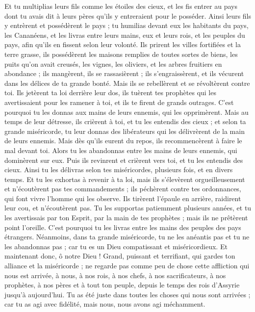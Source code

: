 \begin{multicols}{2}
Et tu multiplias leurs fils comme les étoiles des cieux, et les fis entrer au pays dont tu avais dit à leurs pères qu'ils y entreraient pour le posséder.
Ainsi leurs fils y entrèrent et possédèrent le pays ; tu humilias devant eux les habitants du pays, les Cananéens, et les livras entre leurs mains, eux et leurs rois, et les peuples du pays, afin qu'ils en fissent selon leur volonté.
Ils prirent les villes fortifiées et la terre grasse, ils possédèrent les maisons remplies de toutes sortes de biens, les puits qu'on avait creusés, les vignes, les oliviers, et les arbres fruitiers en abondance ; ils mangèrent, ils se rassasièrent ; ils s'engraissèrent, et ils vécurent dans les délices de ta grande bonté.
Mais ils se rebellèrent et se révoltèrent contre toi. Ils jetèrent ta loi derrière leur dos, ils tuèrent tes prophètes qui les avertissaient pour les ramener à toi, et ils te firent de grands outrages.
C'est pourquoi tu les donnas aux mains de leurs ennemis, qui les opprimèrent. Mais au temps de leur détresse, ils crièrent à toi, et tu les entendis des cieux ; et selon ta grande miséricorde, tu leur donnas des libérateurs qui les délivrèrent de la main de leurs ennemis.
Mais dès qu'ils eurent du repos, ils recommencèrent à faire le mal devant toi. Alors tu les abandonnas entre les mains de leurs ennemis, qui dominèrent sur eux. Puis ils revinrent et crièrent vers toi, et tu les entendis des cieux. Ainsi tu les délivras selon tes miséricordes, plusieurs fois, et en divers temps.
Et tu les exhortas à revenir à ta loi, mais ils s’élevèrent  orgueilleusement et n'écoutèrent pas tes commandements ;  ils péchèrent contre tes ordonnances, qui font vivre l’homme qui les observe. Ils tirèrent l'épaule en arrière, raidirent leur cou, et n'écoutèrent pas.
Tu les supportas patiemment plusieurs années, et tu les avertissais par ton Esprit, par la main de tes prophètes ; mais ils ne prêtèrent point l'oreille. C’est pourquoi tu les livras entre les mains des peuples des pays étrangers.
Néanmoins, dans ta grande miséricorde, tu ne les anéantis pas et tu ne les abandonnas pas ; car tu es un Dieu compatissant et miséricordieux.
Et maintenant donc, ô notre Dieu ! Grand, puissant et terrifiant, qui gardes ton alliance et la miséricorde ; ne regarde pas comme peu de chose cette affliction qui nous est arrivée, à nous, à nos rois, à nos chefs, à nos sacrificateurs, à nos prophètes, à nos pères et à tout ton peuple, depuis le temps des rois d'Assyrie jusqu'à aujourd'hui.
Tu as été juste dans toutes les choses qui nous sont arrivées ; car tu as agi avec fidélité, mais nous, nous avons agi méchamment.

\end{multicols}
